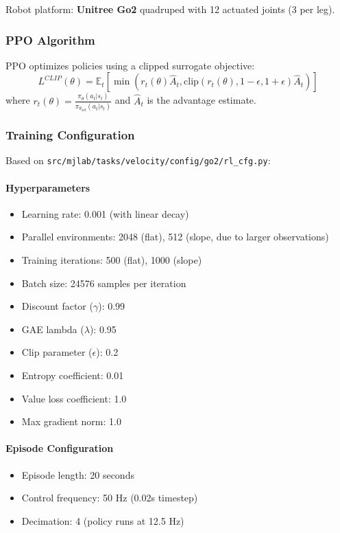 \documentclass[12pt,a4paper]{article}
\begin{document}
Robot platform: \textbf{Unitree Go2} quadruped with 12 actuated joints (3 per leg).

\subsubsection{PPO Algorithm}

PPO optimizes policies using a clipped surrogate objective:
\begin{equation}
L^{CLIP}(\theta) = \mathbb{E}_t\left[\min\left(r_t(\theta)\hat{A}_t, \text{clip}(r_t(\theta), 1-\epsilon, 1+\epsilon)\hat{A}_t\right)\right]
\end{equation}
where $r_t(\theta) = \frac{\pi_\theta(a_t|s_t)}{\pi_{\theta_{old}}(a_t|s_t)}$ and $\hat{A}_t$ is the advantage estimate.

\subsubsection{Training Configuration}

Based on \texttt{src/mjlab/tasks/velocity/config/go2/rl\_cfg.py}:

\paragraph{Hyperparameters}
\begin{itemize}
    \item Learning rate: 0.001 (with linear decay)
    \item Parallel environments: 2048 (flat), 512 (slope, due to larger observations)
    \item Training iterations: 500 (flat), 1000 (slope)
    \item Batch size: 24576 samples per iteration
    \item Discount factor ($\gamma$): 0.99
    \item GAE lambda ($\lambda$): 0.95
    \item Clip parameter ($\epsilon$): 0.2
    \item Entropy coefficient: 0.01
    \item Value loss coefficient: 1.0
    \item Max gradient norm: 1.0
\end{itemize}

\paragraph{Episode Configuration}
\begin{itemize}
    \item Episode length: 20 seconds
    \item Control frequency: 50 Hz (0.02s timestep)
    \item Decimation: 4 (policy runs at 12.5 Hz)
\end{itemize}
\end{document}
